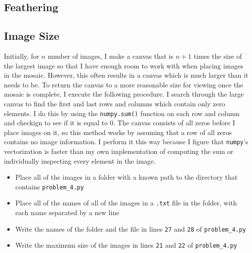 \documentclass[]{article}
\begin{document}
	\subsection{Feathering}
	\subsection{Image Size}
	Initially, for $n$ number of images, I make a canvas that is $n+1$ times the size of the largest image so that I have enough room to work with when placing images in the mosaic. However, this often results in a canvas which is much larger than it needs to be. To return the canvas to a more reasonable size for viewing once the mosaic is complete, I execute the following procedure. I search through the large canvas to find the first and last rows and columns which contain only zero elements. I do this by using the \texttt{numpy.sum()} function on each row and column and checkign to see if it is equal to 0. The canvas consists of all zeros before I place images on it, so this method works by assuming that a row of all zeros contains no image information. I perform it this way because I figure that \texttt{numpy}'s vectorization is faster than my own implementation of computing the sum or individually inspecting every element in the image. 
	\begin{itemize}
	\item Place all of the images in a folder with a known path to the directory that contains \texttt{problem\_4.py}
	\item Place all of the names of all of the images in a \texttt{.txt} file in the folder, with each name separated by a new line
	\item Write the names of the folder and the file in lines \texttt{27} and \texttt{28} of \texttt{problem\_4.py}
	\item Write the maximum size of the images in lines \texttt{21} and \texttt{22} of \texttt{problem\_4.py}
	
\end{itemize}
\end{document}
